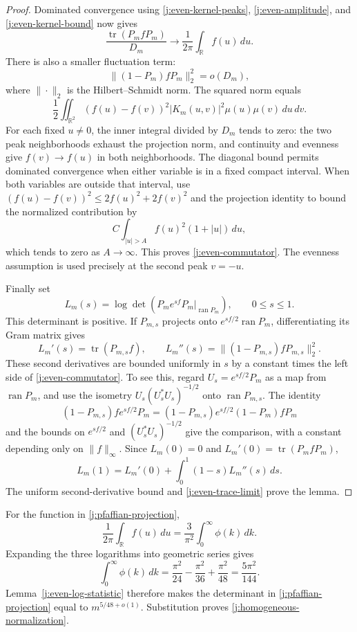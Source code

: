 \begin{proof}
Dominated convergence using \eqref{j:even-kernel-peaks},
\eqref{j:even-amplitude}, and \eqref{j:even-kernel-bound} now gives
\begin{equation}\label{j:even-trace-limit}
 \frac{\operatorname{tr}(P_m fP_m)}{D_m}
 \longrightarrow\frac1{2\pi}\int_{\mathbb R}f(u)\,du.
\end{equation}
There is also a smaller fluctuation term:
\begin{equation}\label{j:even-commutator}
 \|(1-P_m)fP_m\|_2^2=o(D_m),
\end{equation}
where $\|\cdot\|_2$ is the Hilbert--Schmidt norm. The squared norm equals
\[
 \frac12\iint_{\mathbb R^2}
 (f(u)-f(v))^2|K_m(u,v)|^2\mu(u)\mu(v)\,du\,dv.
\]
For each fixed $u\ne0$, the inner integral divided by $D_m$ tends to
zero: the two peak neighborhoods exhaust the projection norm, and
continuity and evenness give $f(v)\to f(u)$ in both neighborhoods.
The diagonal bound permits dominated convergence when either variable
is in a fixed compact interval. When both variables are outside that
interval, use
$(f(u)-f(v))^2\le2f(u)^2+2f(v)^2$ and the projection identity to bound
the normalized contribution by
\[
 C\int_{|u|>A}f(u)^2(1+|u|)\,du,
\]
which tends to zero as $A\to\infty$. This proves
\eqref{j:even-commutator}. The evenness assumption is used precisely
at the second peak $v=-u$.

Finally set
\[
 L_m(s)=\log\det(P_m e^{sf}P_m|_{\operatorname{ran}P_m}),
 \qquad 0\le s\le1.
\]
This determinant is positive. If $P_{m,s}$ projects onto
$e^{sf/2}\operatorname{ran}P_m$, differentiating its Gram matrix gives
\[
 L_m'(s)=\operatorname{tr}(P_{m,s}f),\qquad
 L_m''(s)=\|(1-P_{m,s})fP_{m,s}\|_2^2.
\]
These second derivatives are bounded uniformly in $s$ by a constant
times the left side of \eqref{j:even-commutator}. To see this, regard
$U_s=e^{sf/2}P_m$ as a map from $\operatorname{ran}P_m$, and use the
isometry $U_s(U_s^*U_s)^{-1/2}$ onto
$\operatorname{ran}P_{m,s}$. The identity
\[
 (1-P_{m,s})f e^{sf/2}P_m
 =(1-P_{m,s})e^{sf/2}(1-P_m)fP_m
\]
and the bounds on $e^{sf/2}$ and $(U_s^*U_s)^{-1/2}$ give the
comparison, with a constant depending only on $\|f\|_\infty$.
Since $L_m(0)=0$ and $L_m'(0)=\operatorname{tr}(P_m fP_m)$,
\[
 L_m(1)=L_m'(0)+\int_0^1(1-s)L_m''(s)\,ds.
\]
The uniform second-derivative bound and \eqref{j:even-trace-limit}
prove the lemma.
\end{proof}

For the function in \eqref{j:pfaffian-projection},
\[
 \frac1{2\pi}\int_{\mathbb R}f(u)\,du
 =\frac3{\pi^2}\int_0^\infty\phi(k)\,dk.
\]
Expanding the three logarithms into geometric series gives
\[
 \int_0^\infty\phi(k)\,dk
 =\frac{\pi^2}{24}-\frac{\pi^2}{36}+\frac{\pi^2}{48}
 =\frac{5\pi^2}{144}.
\]
Lemma~\ref{j:even-log-statistic} therefore makes the determinant in
\eqref{j:pfaffian-projection} equal to $m^{5/48+o(1)}$. Substitution
proves \eqref{j:homogeneous-normalization}.
